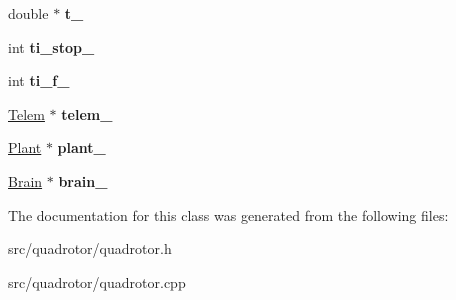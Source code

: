 \begin{DoxyCompactItemize}
\item 
\hypertarget{classQuadrotor_aedbff387d4ec89d5e7464153a24027a6}{double $\ast$ {\bfseries t\-\_\-}}\label{classQuadrotor_aedbff387d4ec89d5e7464153a24027a6}

\item 
\hypertarget{classQuadrotor_a290b8871d95f9adb6005c11540375a17}{int {\bfseries ti\-\_\-stop\-\_\-}}\label{classQuadrotor_a290b8871d95f9adb6005c11540375a17}

\item 
\hypertarget{classQuadrotor_a7eadaf46ba0199a2455274bf4102e68f}{int {\bfseries ti\-\_\-f\-\_\-}}\label{classQuadrotor_a7eadaf46ba0199a2455274bf4102e68f}

\item 
\hypertarget{classQuadrotor_a2ae40aa937f36b17d050d077cf82fa10}{\hyperlink{classTelem}{\-Telem} $\ast$ {\bfseries telem\-\_\-}}\label{classQuadrotor_a2ae40aa937f36b17d050d077cf82fa10}

\item 
\hypertarget{classQuadrotor_a2d994ec0dfa9b08013cce986b1fe10bd}{\hyperlink{classPlant}{\-Plant} $\ast$ {\bfseries plant\-\_\-}}\label{classQuadrotor_a2d994ec0dfa9b08013cce986b1fe10bd}

\item 
\hypertarget{classQuadrotor_ad1dbea34777ea6e3410a94c248ab2455}{\hyperlink{classBrain}{\-Brain} $\ast$ {\bfseries brain\-\_\-}}\label{classQuadrotor_ad1dbea34777ea6e3410a94c248ab2455}

\end{DoxyCompactItemize}


\-The documentation for this class was generated from the following files\-:\begin{DoxyCompactItemize}
\item 
src/quadrotor/quadrotor.\-h\item 
src/quadrotor/quadrotor.\-cpp\end{DoxyCompactItemize}
